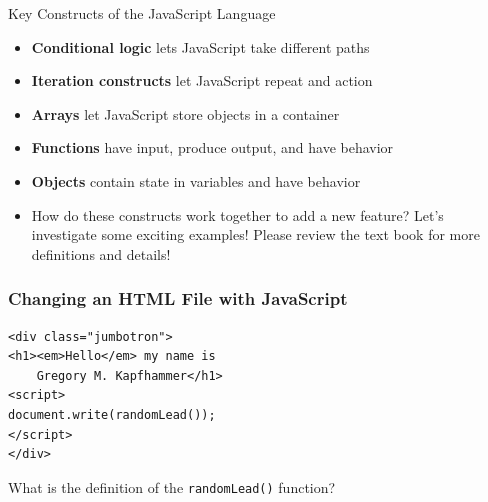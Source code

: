 \documentclass[14pt,aspectratio=169]{beamer}
\begin{document}
%
\begin{frame}{Key Constructs of the JavaScript Language}
  \begin{itemize}
    \item {\bf Conditional logic} lets JavaScript take different paths
      \vspace*{-.15in}
    \item {\bf Iteration constructs} let JavaScript repeat and action
      \vspace*{-.15in}
    \item {\bf Arrays} let JavaScript store objects in a container
      \vspace*{-.15in}
    \item {\bf Functions} have input, produce output, and have behavior
      \vspace*{-.15in}
    \item {\bf Objects} contain state in variables and have behavior
      \vspace*{-.15in}
    \item How do these constructs work together to add a new feature? Let's
      investigate some exciting examples! Please review the text book for more
      definitions and details!
      \vspace*{-.15in}
  \end{itemize}
\end{frame}

%
\begin{frame}[fragile]
  \frametitle{Changing an HTML File with JavaScript}
  \normalsize
  \begin{minipage}{6in}
    \vspace*{.2in}
    \begin{verbatim}
<div class="jumbotron">
<h1><em>Hello</em> my name is
    Gregory M. Kapfhammer</h1>
<script>
document.write(randomLead());
</script>
</div>
    \end{verbatim}
  \end{minipage}
  \vspace*{.1in}
  \begin{center}
    What is the definition of the {\tt randomLead()} function?
  \end{center}
\end{frame}
\end{document}
